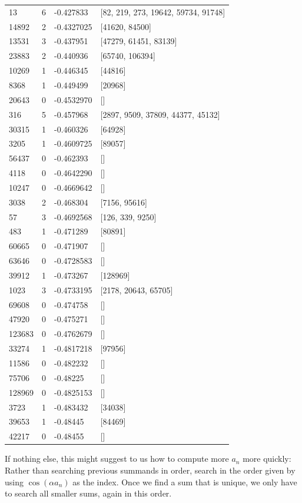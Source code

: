 \documentclass{article}
\theoremstyle{definition}
\theoremstyle{remark}
\numberwithin{equation}{section}
\begin{document}
{\begin{tabular}{llll}
13 & 6 & -0.427833 & [82, 219, 273, 19642, 59734, 91748]\\
14892 & 2 & -0.4327025 & [41620, 84500]\\
13531 & 3 & -0.437951 & [47279, 61451, 83139]\\
23883 & 2 & -0.440936 & [65740, 106394]\\
10269 & 1 & -0.446345 & [44816]\\
8368 & 1 & -0.449499 & [20968]\\
20643 & 0 & -0.4532970 & []\\
316 & 5 & -0.457968 & [2897, 9509, 37809, 44377, 45132]\\
30315 & 1 & -0.460326 & [64928]\\
3205 & 1 & -0.4609725 & [89057]\\
56437 & 0 & -0.462393 & []\\
4118 & 0 & -0.4642290 & []\\
10247 & 0 & -0.4669642 & []\\
3038 & 2 & -0.468304 & [7156, 95616]\\
57 & 3 & -0.4692568 & [126, 339, 9250]\\
483 & 1 & -0.471289 & [80891]\\
60665 & 0 & -0.471907 & []\\
63646 & 0 & -0.4728583 & []\\
39912 & 1 & -0.473267 & [128969]\\
1023 & 3 & -0.4733195 & [2178, 20643, 65705]\\
69608 & 0 & -0.474758 & []\\
47920 & 0 & -0.475271 & []\\
123683 & 0 & -0.4762679 & []\\
33274 & 1 & -0.4817218 & [97956]\\
11586 & 0 & -0.482232 & []\\
75706 & 0 & -0.48225 & []\\
128969 & 0 & -0.4825153 & []\\
3723 & 1 & -0.483432 & [34038]\\
39653 & 1 & -0.48445 & [84469]\\
42217 & 0 & -0.48455 & []
\end{tabular}

If nothing else, this might suggest to us how to compute more $a_n$ more
quickly: Rather than searching previous summands in order, search in
the order given by using $\cos(\alpha a_n)$ as the index.  Once we find a
sum that is unique, we only have to search all smaller sums, again in
this order.  

}
\end{document}
